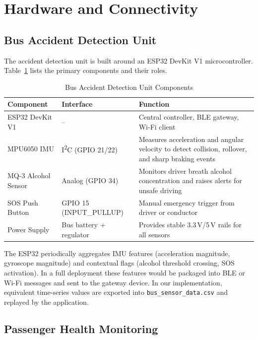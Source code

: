 \documentclass[conference]{IEEEtran}
\begin{document}
\section{Hardware and Connectivity}

\subsection{Bus Accident Detection Unit}

The accident detection unit is built around an ESP32 DevKit V1 microcontroller.
Table~\ref{tab:hardware} lists the primary components and their roles.

\begin{table}[!t]
    \caption{Bus Accident Detection Unit Components}
    \label{tab:hardware}
    \raggedright
    \scriptsize
    \begin{tabular}{llp{3.4cm}}
        \toprule
        \textbf{Component} & \textbf{Interface} & \textbf{Function} \\
        \midrule
        ESP32 DevKit V1 & -- & Central controller, BLE gateway, Wi-Fi client \\
        MPU6050 IMU & I\textsuperscript{2}C (GPIO 21/22) & Measures acceleration and angular velocity to detect collision, rollover, and sharp braking events \\
        MQ-3 Alcohol Sensor & Analog (GPIO 34) & Monitors driver breath alcohol concentration and raises alerts for unsafe driving \\
        SOS Push Button & GPIO 15 (INPUT\_PULLUP) & Manual emergency trigger from driver or conductor \\
        Power Supply & Bus battery + regulator & Provides stable 3.3\,V/5\,V rails for all sensors \\
        \bottomrule
    \end{tabular}
\end{table}

The ESP32 periodically aggregates IMU features (acceleration magnitude, gyroscope magnitude) and contextual flags (alcohol threshold crossing, SOS activation).
In a full deployment these features would be packaged into BLE or Wi-Fi messages and sent to the gateway device.
In our implementation, equivalent time-series values are exported into \texttt{bus\_sensor\_data.csv} and replayed by the application.

\subsection{Passenger Health Monitoring}
\end{document}
